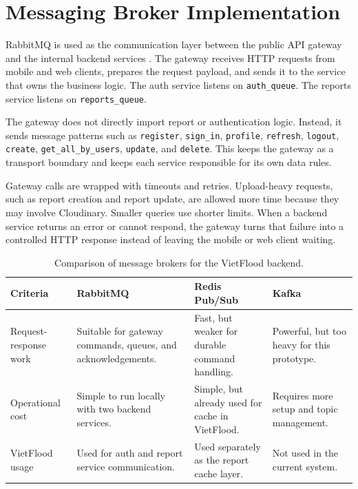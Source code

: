 \section{Messaging Broker Implementation}

RabbitMQ is used as the communication layer between the public API gateway and the internal backend services \cite{rabbitmqConfirmsDocs,nestjsMicroservicesDocs}. The gateway receives HTTP requests from mobile and web clients, prepares the request payload, and sends it to the service that owns the business logic. The auth service listens on \texttt{auth\_queue}. The reports service listens on \texttt{reports\_queue}.

The gateway does not directly import report or authentication logic. Instead, it sends message patterns such as \texttt{register}, \texttt{sign\_in}, \texttt{profile}, \texttt{refresh}, \texttt{logout}, \texttt{create}, \texttt{get\_all\_by\_users}, \texttt{update}, and \texttt{delete}. This keeps the gateway as a transport boundary and keeps each service responsible for its own data rules.

Gateway calls are wrapped with timeouts and retries. Upload-heavy requests, such as report creation and report update, are allowed more time because they may involve Cloudinary. Smaller queries use shorter limits. When a backend service returns an error or cannot respond, the gateway turns that failure into a controlled HTTP response instead of leaving the mobile or web client waiting.

\begin{table}[H]
    \centering
    \caption{Comparison of message brokers for the VietFlood backend.}
    \setlength{\tabcolsep}{8pt}
    \renewcommand{\arraystretch}{1.45}
    \begin{tabular}{|p{3.1cm}|p{3.2cm}|p{3.2cm}|p{3.2cm}|}
        \hline
        \textbf{Criteria} & \textbf{RabbitMQ} & \textbf{Redis Pub/Sub} & \textbf{Kafka} \\
        \hline
        Request-response work & Suitable for gateway commands, queues, and acknowledgements. & Fast, but weaker for durable command handling. & Powerful, but too heavy for this prototype. \\
        \hline
        Operational cost & Simple to run locally with two backend services. & Simple, but already used for cache in VietFlood. & Requires more setup and topic management. \\
        \hline
        VietFlood usage & Used for auth and report service communication. & Used separately as the report cache layer. & Not used in the current system. \\
        \hline
    \end{tabular}
    \label{tab:vietflood-broker-comparison}
\end{table}

